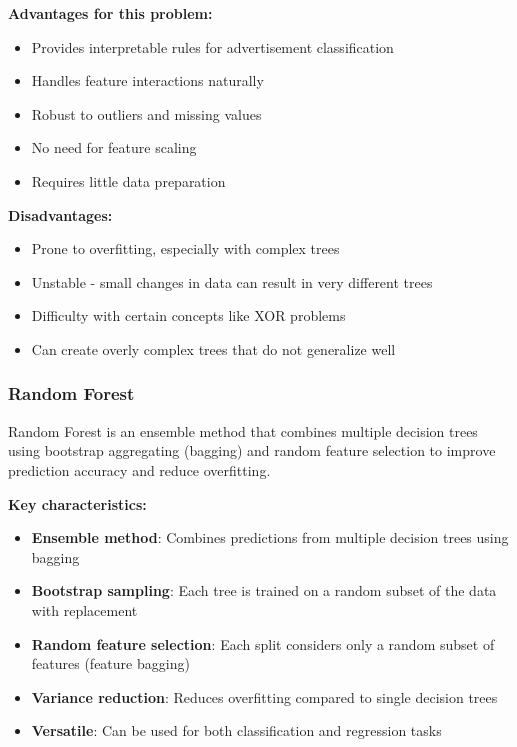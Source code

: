 \textbf{Advantages for this problem:}
\begin{itemize}
    \item Provides interpretable rules for advertisement classification
    \item Handles feature interactions naturally
    \item Robust to outliers and missing values
    \item No need for feature scaling
    \item Requires little data preparation
\end{itemize}

\textbf{Disadvantages:}
\begin{itemize}
    \item Prone to overfitting, especially with complex trees
    \item Unstable - small changes in data can result in very different trees
    \item Difficulty with certain concepts like XOR problems
    \item Can create overly complex trees that do not generalize well
\end{itemize}

\subsubsection{Random Forest}
Random Forest is an ensemble method that combines multiple decision trees using bootstrap aggregating (bagging) and random feature selection to improve prediction accuracy and reduce overfitting.

\textbf{Key characteristics:}
\begin{itemize}
    \item \textbf{Ensemble method}: Combines predictions from multiple decision trees using bagging \cite{breiman2001random}
    \item \textbf{Bootstrap sampling}: Each tree is trained on a random subset of the data with replacement
    \item \textbf{Random feature selection}: Each split considers only a random subset of features (feature bagging)
    \item \textbf{Variance reduction}: Reduces overfitting compared to single decision trees
    \item \textbf{Versatile}: Can be used for both classification and regression tasks \cite{builtin2024random}
\end{itemize}

